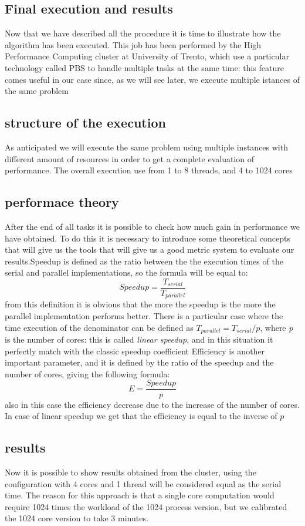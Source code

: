 \documentclass[10pt]{article}
\begin{document}
\begin{multicols}{2}
\section{Final execution and results}
Now that we have described all the procedure it is time to illustrate how 
the algorithm has been executed. This job has been performed by the
High Performance Computing cluster at University of Trento, which 
use a particular technology called PBS to handle multiple tasks at the same
time: this feature comes useful in our case since, as we will see later, we 
execute multiple istances of the same problem
\subsection*{structure of the execution}

As anticipated we will execute the same problem using multiple instances with different amount of
resources in order to get a complete evaluation of performance. The overall execution use from 1 to 8
threads, and 4 to 1024 cores

\subsection*{performace theory}

After the end of all tasks it is possible to check how much gain in performance we have obtained.
To do this it is necessary to introduce some theoretical concepts that will give us the tools that
will give us a good metric system to evaluate our results.Speedup is defined as the ratio between the the execution times of the serial and parallel
implementations, so the formula will be equal to: $$Speedup = \frac{T_{serial}}{T_{parallel}}$$ 
from this definition it is obvious that the more the speedup is the more the parallel implementation
performs better. There is a particular case where the time execution of the denominator can be defined
as $T_{parallel}=T_{serial}/p$, where \textit{p} is the number of cores: this is called \textit{linear speedup},
and in this situation it perfectly match with the classic speedup coefficient
Efficiency is another important parameter, and it is defined by the ratio of the speedup and the 
number of cores, giving the following formula: $$E = \frac{Speedup}{p}$$
also in this case the efficiency decrease due to the increase of the number of cores. In case
of linear speedup we get that the efficiency is equal to the inverse of $p$
\subsection*{results}
\label{results}
Now it is possible to show results obtained from the cluster,
using the configuration with 4 cores and 1 thread will be considered
equal as the serial time. The reason for this approach is that a single core computation would require 1024 times the workload of the 1024 process version, but we calibrated the 1024 core version to take 3 minutes.



\end{multicols}
\end{document}
